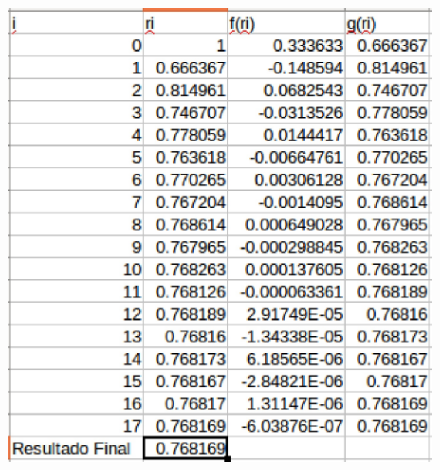 \documentclass[a4paper,12pt]{article}
\begin{document}
\begin{itemize}
      \begin{figure}[h]
      \centering
      \includegraphics[scale = 0.6]{72.eps}
     \end{figure}
    
    \end{itemize}
    
    
\end{document}

